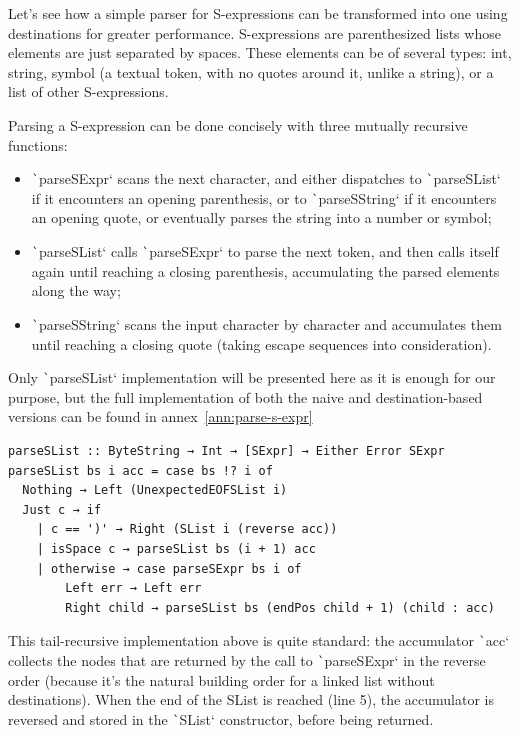 \documentclass[english]{jflart}
\begin{document}
Let's see how a simple parser for S-expressions can be transformed into one using destinations for greater performance. S-expressions are parenthesized lists whose elements are just separated by spaces. These elements can be of several types: int, string, symbol (a textual token, with no quotes around it, unlike a string), or a list of other S-expressions.

Parsing a S-expression can be done concisely with three mutually recursive functions:
\begin{itemize}
  \item \texttt`parseSExpr` scans the next character, and either dispatches to \texttt`parseSList` if it encounters an opening parenthesis, or to \texttt`parseSString` if it encounters an opening quote, or eventually parses the string into a number or symbol;
  \item \texttt`parseSList` calls \texttt`parseSExpr` to parse the next token, and then calls itself again until reaching a closing parenthesis, accumulating the parsed elements along the way;
  \item \texttt`parseSString` scans the input character by character and accumulates them until reaching a closing quote (taking escape sequences into consideration).
\end{itemize}

Only \texttt`parseSList` implementation will be presented here as it is enough for our purpose, but the full implementation of both the naive and destination-based versions can be found in annex~\ref{ann:parse-s-expr}

{\small
\begin{verbatim}
parseSList :: ByteString → Int → [SExpr] → Either Error SExpr
parseSList bs i acc = case bs !? i of
  Nothing → Left (UnexpectedEOFSList i)
  Just c → if
    | c == ')' → Right (SList i (reverse acc))
    | isSpace c → parseSList bs (i + 1) acc
    | otherwise → case parseSExpr bs i of
        Left err → Left err
        Right child → parseSList bs (endPos child + 1) (child : acc)
\end{verbatim}
}

This tail-recursive implementation above is quite standard: the accumulator \texttt`acc` collects the nodes that are returned by the call to \texttt`parseSExpr` in the reverse order (because it's the natural building order for a linked list without destinations). When the end of the SList is reached (line 5), the accumulator is reversed and stored in the \texttt`SList` constructor, before being returned.
\end{document}
